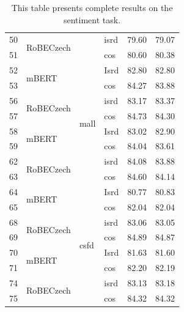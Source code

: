 \begin{table}[]
{\begin{tabular}{|l|l|l|l||ll|}
50 & \multirow{2}{*}{RoBECzech} &                           & isrd                  & 79.60   & 79.07 \\ \cline{1-1} \cline{4-6}
51 &                            &                           & cos                   & 80.60   & 80.38 \\ \hline
52 & \multirow{2}{*}{mBERT}     & \multirow{8}{*}{mall}     & Isrd                  & 82.80   & 82.80 \\ \cline{1-1} \cline{4-6}
53 &                            &                           & cos                   & 84.27   & 83.88 \\ \cline{1-2} \cline{4-6}
56 & \multirow{2}{*}{RoBECzech} &                           & isrd                  & 83.17   & 83.37 \\ \cline{1-1} \cline{4-6}
57 &                            &                           & cos                   & 84.73   & 84.30 \\ \cline{1-2} \cline{4-6}
58 & \multirow{2}{*}{mBERT}     &                           & Isrd                  & 83.02   & 82.90 \\ \cline{1-1} \cline{4-6}
59 &                            &                           & cos                   & 84.04   & 83.61 \\ \cline{1-2} \cline{4-6}
62 & \multirow{2}{*}{RoBECzech} &                           & isrd                  & 84.08   & 83.88 \\ \cline{1-1} \cline{4-6}
63 &                            &                           & cos                   & 84.60   & 84.14 \\ \hline
64 & \multirow{2}{*}{mBERT}     & \multirow{8}{*}{csfd}     & Isrd                  & 80.77   & 80.83 \\ \cline{1-1} \cline{4-6}
65 &                            &                           & cos                   & 82.04   & 82.04 \\ \cline{1-2} \cline{4-6}
68 & \multirow{2}{*}{RoBECzech} &                           & isrd                  & 83.06   & 83.05 \\ \cline{1-1} \cline{4-6}
69 &                            &                           & cos                   & 84.89   & 84.87 \\ \cline{1-2} \cline{4-6}
70 & \multirow{2}{*}{mBERT}     &                           & Isrd                  & 81.63   & 81.60 \\ \cline{1-1} \cline{4-6}
71 &                            &                           & cos                   & 82.20   & 82.19 \\ \cline{1-2} \cline{4-6}
74 & \multirow{2}{*}{RoBECzech} &                           & isrd                  & 83.13   & 83.18 \\ \cline{1-1} \cline{4-6}
75 &                            &                           & cos                   & 84.32   & 84.32 \\ \hline
\end{tabular}}
\caption{This table presents complete results on the sentiment task. }
\label{tab:res_all_sent}
\end{table}

